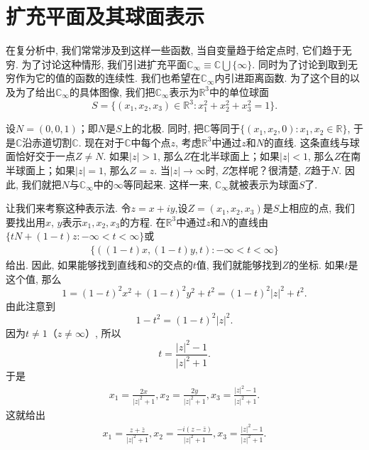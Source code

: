 \section{扩充平面及其球面表示}\label{subsection0020106}
在复分析中, 我们常常涉及到这样一些函数, 当自变量趋于给定点时, 它们趋于无穷. 为了讨论这种情形, 我们引进扩充平面$\mathbb{C}_{\infty}\equiv \mathbb{C} \bigcup \{\infty\}$. 同时为了讨论到取到无穷作为它的值的函数的连续性. 我们也希望在$\mathbb{C}_{\infty}$内引进距离函数. 为了这个目的以及为了给出$\mathbb{C}_{\infty}$的具体图像, 我们把$\mathbb{C}_{\infty}$表示为$\mathbb{R}^3$中的单位球面
\[
S = \{(x_1,x_2,x_3) \in \mathbb{R}^3:x_1^2 + x_2^2 + x_3^2=1\}.
\]

设$N=(0, 0,1)$；即$N$是$S$上的北极. 同时, 把$\mathbb{C}$等同于$\{(x_1,x_2,0):x_1,x_2 \in \mathbb{R}\}$, 于是$\mathbb{C}$沿赤道切割$\mathbb{C}$. 现在对于$\mathbb{C}$中每个点$z$, 考虑$\mathbb{R}^3$中通过$z$和$N$的直线. 这条直线与球面恰好交于一点$Z \neq N$. 如果$|z| > 1$, 那么$Z$在北半球面上；如果$|z|<1$, 那么$Z$在南半球面上；如果$|z|=1$, 那么$Z = z$. 当$|z| \to \infty$时, $Z$怎样呢？很清楚, $Z$趋于$N$. 因此, 我们就把$N$与$\mathbb{C}_{\infty}$中的$\infty$等同起来. 这样一来, $\mathbb{C}_{\infty}$就被表示为球面$S$了. 

让我们来考察这种表示法. 令$z=x+iy$,设$Z = (x_1, x_2, x_3)$是$S$上相应的点, 我们要找出用$x$, $y$表示$x_1, x_2, x_3$的方程. 在$\mathbb{R}^3$中通过$z$和$N$的直线由$\{tN + (1-t)z:-\infty<t<\infty\}$或
\begin{gather}\label{equ002010601}
\{((1-t)x, (1-t)y, t): -\infty < t < \infty\}
\end{gather}
给出. 因此, 如果能够找到直线和$S$的交点的$t$值, 我们就能够找到$Z$的坐标. 如果$t$是这个值, 那么
\[
1 = (1-t)^2x^2 + (1-t)^2y^2 + t^2 = (1-t)^2|z|^2 + t^2.
\]
由此注意到
\[
1-t^2 = (1-t)^2|z|^2.
\]
因为$t \neq 1$（$z \neq \infty$）, 所以
\[
t = \frac{|z|^2-1}{|z|^2+1}.
\]
于是
\begin{gather}\label{equ002010602}
x_1 = \frac{2x}{|z|^2+1}, x_2 = \frac{2y}{|z|^2+1}, x_3 = \frac{|z|^2-1}{|z|^2+1}.
\end{gather}
这就给出
\begin{gather}\label{equ002010603}
x_1 = \frac{z + \bar{z}}{|z|^2+1}, x_2 = \frac{-i(z-\bar{z})}{|z|^2+1}, x_3 = \frac{|z|^2-1}{|z|^2+1}.
\end{gather}

